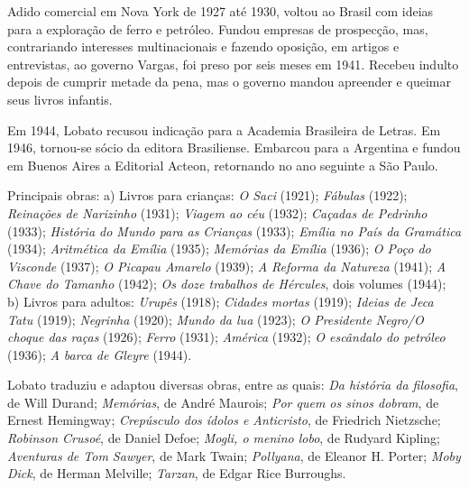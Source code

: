 \documentclass[11pt]{extarticle}
\begin{document}
Adido comercial em Nova York de 1927 até 1930, voltou ao Brasil com
ideias para a exploração de ferro e petróleo. Fundou empresas de
prospecção, mas, contrariando interesses multinacionais e fazendo
oposição, em artigos e entrevistas, ao governo Vargas, foi preso por
seis meses em 1941. Recebeu indulto depois de cumprir metade da pena,
mas o governo mandou apreender e queimar seus livros infantis.

Em 1944, Lobato recusou indicação para a Academia Brasileira de Letras.
Em 1946, tornou-se sócio da editora Brasiliense. Embarcou para a
Argentina e fundou em Buenos Aires a Editorial Acteon, retornando no ano
seguinte a São Paulo.

Principais obras: a) Livros para crianças: \emph{O Saci} (1921);
\emph{Fábulas} (1922); \emph{Reinações de Narizinho} (1931);
\emph{Viagem ao céu} (1932); \emph{Caçadas de Pedrinho} (1933);
\emph{História do Mundo para as} \emph{Crianças} (1933); \emph{Emília no
País da Gramática} (1934); \emph{Aritmética da Emília} (1935);
\emph{Memórias da Emília} (1936); \emph{O Poço do Visconde} (1937);
\emph{O Picapau Amarelo} (1939); \emph{A Reforma da Natureza} (1941);
\emph{A Chave do Tamanho} (1942); \emph{Os doze trabalhos de Hércules},
dois volumes (1944); b) Livros para adultos: \emph{Urupês} (1918);
\emph{Cidades} \emph{mortas} (1919); \emph{Ideias de Jeca Tatu} (1919);
\emph{Negrinha} (1920); \emph{Mundo da lua} (1923); \emph{O Presidente
Negro/O choque das raças} (1926); \emph{Ferro} (1931); \emph{América}
(1932); \emph{O escândalo do petróleo} (1936); \emph{A barca de Gleyre}
(1944).


Lobato traduziu e adaptou diversas obras, entre as quais: \emph{Da
história da filosofia}, de Will Durand; \emph{Memórias}, de André
Maurois; \emph{Por quem os sinos dobram}, de Ernest Hemingway;
\emph{Crepúsculo dos ídolos e Anticristo}, de Friedrich Nietzsche;
\emph{Robinson Crusoé}, de Daniel Defoe; \emph{Mogli, o menino lobo}, de
Rudyard Kipling; \emph{Aventuras de Tom Sawyer}, de Mark Twain;
\emph{Pollyana}, de Eleanor H. Porter; \emph{Moby Dick}, de Herman
Melville; \emph{Tarzan}, de Edgar Rice Burroughs.

\end{document}
